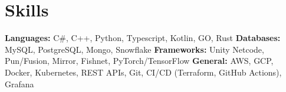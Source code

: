 \vspace{5 pt - 0.3 cm}
\section{Skills}
\begin{onecolentry}
    \textbf{Languages:} C\#, C++, Python, Typescript, Kotlin, GO, Rust \newline
    \textbf{Databases:} MySQL, PostgreSQL, Mongo, Snowflake \newline
    \textbf{Frameworks:} Unity Netcode, Pun/Fusion, Mirror, Fishnet, PyTorch/TensorFlow  \newline
    \textbf{General:} AWS, GCP, Docker, Kubernetes, REST APIs, Git, CI/CD (Terraform, GitHub Actions), Grafana \newline
\end{onecolentry}
